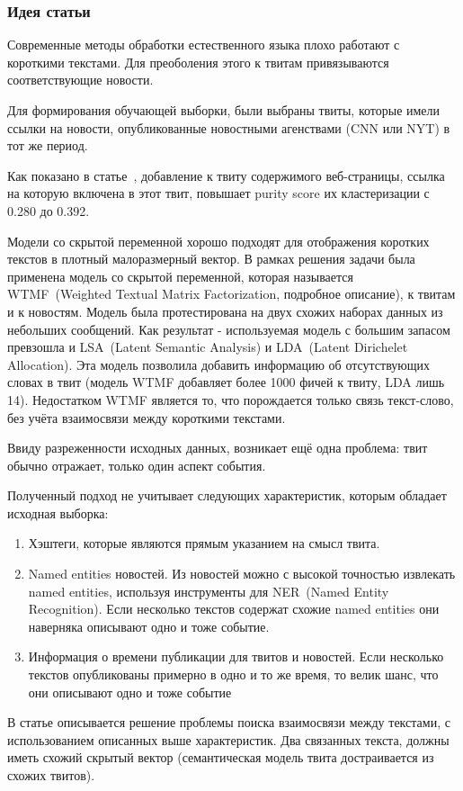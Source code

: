 \documentclass[14pt,a4paper,oneside]{extarticle}
\begin{document}
        \subsubsection{Идея статьи}
        Современные методы обработки естественного языка плохо работают с короткими текстами. Для преоболения этого к твитам привязываются соответствующие новости. 

        Для формирования обучающей выборки, были выбраны твиты, которые имели ссылки на новости, опубликованные новостными агенствами (CNN или NYT) в тот же период.
        
        Как показано в статье~\cite{long_to_short}, добавление к твиту содержимого веб-страницы, ссылка на которую включена в этот твит, повышает {\color{red} purity score} их кластеризации с 0.280 до 0.392.

        Модели со скрытой переменной хорошо подходят для отображения коротких текстов в плотный малоразмерный вектор.
        В рамках решения задачи была применена модель со скрытой переменной, которая называется WTMF~(Weighted Textual Matrix Factorization, подробное описание\cite{wtmf}), к твитам и к новостям. Модель была протестирована на двух схожих наборах данных из небольших сообщений. Как результат - используемая модель с большим запасом превзошла и LSA~(Latent Semantic Analysis) и LDA~(Latent Dirichelet Allocation). Эта модель позволила добавить информацию об отсутствующих словах в твит (модель WTMF добавляет более 1000 фичей к твиту, LDA лишь 14). Недостатком WTMF является то, что порождается только связь текст-слово, без учёта взаимосвязи между короткими текстами.
        
        Ввиду разреженности исходных данных, возникает ещё одна проблема: твит обычно отражает, только один аспект события.

        Полученный подход не учитывает следующих характеристик, которым обладает исходная выборка:
        \begin{enumerate}
            \item Хэштеги, которые являются прямым указанием на смысл твита.
            \item {\color{red} Named entities} новостей. Из новостей можно с высокой точностью извлекать {\color{red} named entities}, используя инструменты для NER~(Named Entity Recognition). Если несколько текстов содержат схожие {\color{red} named entities} они наверняка описывают одно и тоже событие.
            \item Информация о времени публикации для твитов и новостей. Если несколько текстов опубликованы примерно в одно и то же время, то велик шанс, что они описывают одно и тоже событие
        \end{enumerate}
        В статье описывается решение проблемы поиска взаимосвязи между текстами, с использованием описанных выше характеристик. Два связанных текста, должны иметь схожий скрытый вектор (семантическая модель твита достраивается из схожих твитов).
\end{document}
